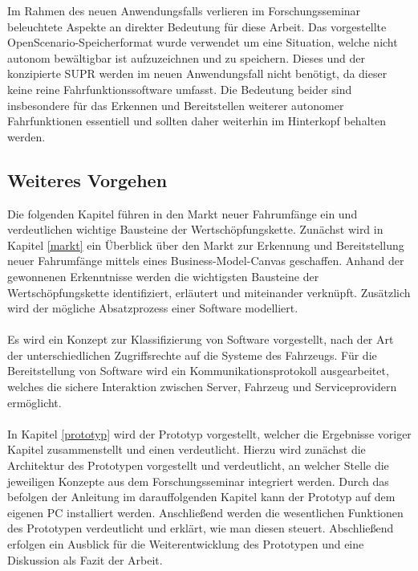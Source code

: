 Im Rahmen des neuen Anwendungsfalls verlieren im Forschungsseminar beleuchtete Aspekte an direkter Bedeutung für diese Arbeit. Das vorgestellte OpenScenario-Speicherformat wurde verwendet um eine Situation, welche nicht autonom bewältigbar ist aufzuzeichnen und zu speichern. Dieses und der konzipierte SUPR werden im neuen Anwendungsfall nicht benötigt, da dieser keine reine Fahrfunktionssoftware umfasst. Die Bedeutung beider sind insbesondere für das Erkennen und Bereitstellen weiterer autonomer Fahrfunktionen essentiell und sollten daher weiterhin im Hinterkopf behalten werden.\\

\subsection{Weiteres Vorgehen}
Die folgenden Kapitel führen in den Markt neuer Fahrumfänge ein und verdeutlichen wichtige  Bausteine der Wertschöpfungskette. Zunächst wird in Kapitel \ref{markt} ein Überblick über den Markt zur Erkennung und Bereitstellung neuer Fahrumfänge mittels eines Business-Model-Canvas geschaffen. Anhand der gewonnenen Erkenntnisse werden die wichtigsten Bausteine der Wertschöpfungskette identifiziert, erläutert und miteinander verknüpft. Zusätzlich wird der mögliche Absatzprozess einer Software modelliert.\\\\
Es wird ein Konzept zur Klassifizierung von Software vorgestellt, nach der Art der unterschiedlichen Zugriffsrechte auf die Systeme des Fahrzeugs. Für die Bereitstellung von Software wird ein Kommunikationsprotokoll ausgearbeitet, welches die sichere Interaktion zwischen Server, Fahrzeug und Serviceprovidern ermöglicht.\\\\
In Kapitel \ref{prototyp} wird der Prototyp vorgestellt, welcher die Ergebnisse voriger Kapitel zusammenstellt und einen verdeutlicht. Hierzu wird zunächst die Architektur des Prototypen vorgestellt und verdeutlicht, an welcher Stelle die jeweiligen Konzepte aus dem Forschungsseminar integriert werden. Durch das befolgen der Anleitung im darauffolgenden Kapitel kann der Prototyp auf dem eigenen PC installiert werden. Anschließend werden die wesentlichen Funktionen des Prototypen verdeutlicht und erklärt, wie man diesen steuert. Abschließend erfolgen ein Ausblick für die Weiterentwicklung des Prototypen und eine Diskussion als Fazit der Arbeit.